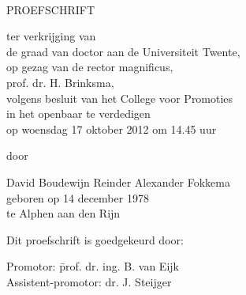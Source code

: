 \begin{center}

\vspace*{2cm}

\\[1em]


\begin{onehalfspace}

\vspace{2cm}

PROEFSCHRIFT

\vspace{2cm}

ter verkrijging van\\
de graad van doctor aan de Universiteit Twente,\\
op gezag van de rector magnificus,\\
prof. dr. H. Brinksma,\\
volgens besluit van het College voor Promoties\\
in het openbaar te verdedigen\\
op woensdag 17 oktober 2012 om 14.45 uur\\

\vspace{1cm}

door

\vspace{1cm}

David Boudewijn Reinder Alexander Fokkema\\
geboren op 14 december 1978\\
te Alphen aan den Rijn

\end{onehalfspace}
\end{center}


\newpage


\noindent
Dit proefschrift is goedgekeurd door:
\begin{tabbing}
Promotor: \hspace{2cm} \= prof. dr. ing. B. van Eijk \\
Assistent-promotor: \> dr. J. Steijger
\end{tabbing}
